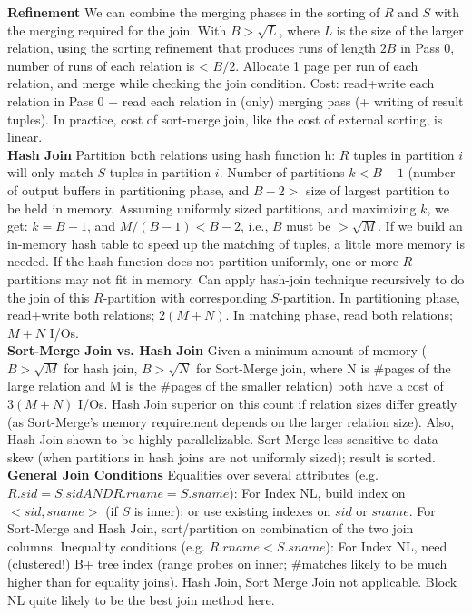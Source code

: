 \documentclass[12pt,landscape]{article}
\begin{document}
\begin{multicols}{3}
{\bf Refinement} We can combine the merging phases in the sorting of $R$ and $S$ with the merging required for the join. With $B>\sqrt{L}$, where $L$ is the size of the larger relation, using the sorting refinement that produces runs of length $2B$ in Pass 0, number of runs of each relation is < $B/2$. Allocate 1 page per run of each relation, and merge while checking the join condition. Cost: read+write each relation in Pass 0 + read each relation in (only) merging pass (+ writing of result tuples). In practice, cost of sort-merge join, like the cost of external sorting, is linear. \\
{\bf Hash Join} Partition both relations using hash function h: $R$ tuples in partition $i$ will only match $S$ tuples in partition $i$. Number of partitions $k < B-1$ (number of output buffers in partitioning phase, and $B-2 >$ size of largest partition to be held in memory. Assuming uniformly sized partitions, and maximizing $k$, we get: $k= B-1$, and $M/(B-1) < B-2$, i.e., $B$ must be $ > \sqrt{M}$. If we build an in-memory hash table to speed up the
matching of tuples, a little more memory is needed. If the hash function does not partition uniformly, one or more $R$ partitions may not fit in memory. Can apply hash-join technique recursively to do the join of this $R$-partition with corresponding $S$-partition. In partitioning phase, read+write both relations; $2(M+N)$. In matching phase, read both relations; $M+N$ I/Os.\\
{\bf  Sort-Merge Join vs. Hash Join} Given a minimum amount of memory ($B > \sqrt{M}$ for hash join, $B > \sqrt{N}$ for Sort-Merge join, where N is \#pages of the large relation and M is the \#pages of the smaller relation) both have a cost of $3(M+N)$ I/Os. Hash Join superior on this count if relation sizes differ greatly (as Sort-Merge's memory requirement depends on the larger relation size). Also, Hash Join shown to be highly parallelizable. Sort-Merge less sensitive to data skew (when partitions in hash joins are not uniformly sized); result is sorted.\\
{\bf General Join Conditions} Equalities over several attributes (e.g. $R.sid=S.sid AND R.rname=S.sname$): For Index NL, build index on $<sid, sname>$ (if $S$ is inner); or use existing indexes on $sid$ or $sname$. For Sort-Merge and Hash Join, sort/partition on combination of the two join columns. Inequality conditions (e.g. $R.rname < S.sname$): For Index NL, need (clustered!) B+ tree index (range probes on inner; \#matches likely to be much higher than for equality joins). Hash Join, Sort Merge Join not applicable. Block NL quite likely to be the best join method here.


\end{multicols}
\end{document}
